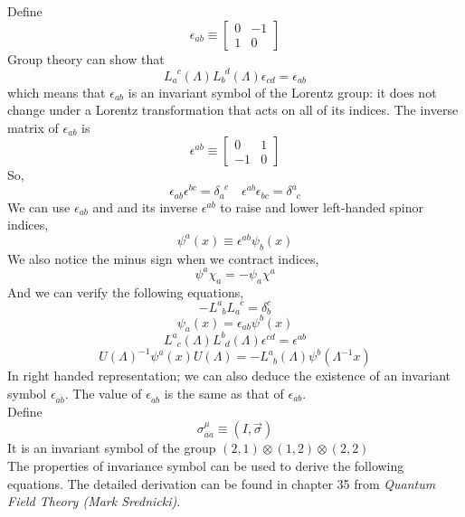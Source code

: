 \noindent
Define
\[\epsilon_{ab} \equiv \left[ \begin{matrix} 0& -1\\ 1& 0\end{matrix} \right] \]
Group theory can show that
\[L_a^{\phantom{a}c}(\Lambda) L_b^{\phantom{b}d}(\Lambda) \epsilon_{cd} = \epsilon
_{ab}\]
which means that $\epsilon_{ab}$ is an invariant symbol of the Lorentz group: it does not change under a Lorentz transformation that acts on all of its indices. The inverse matrix of $\epsilon_{ab}$ is
\[\epsilon^{ab} \equiv \left[ \begin{matrix} 0& 1\\ -1& 0\end{matrix} \right] \]
So,
\[\epsilon_{ab}\epsilon^{bc} = \delta_a^{\phantom{a}c} \quad \epsilon^{ab}\epsilon_{bc} = \delta^a_{\phantom{a}c}\]
We can use $\epsilon_{ab}$ and and its inverse $\epsilon^{ab}$ to raise and lower left-handed spinor indices, 
\[\psi^a(x) \equiv \epsilon^{ab} \psi_b(x)\]
We also notice the minus sign when we contract indices,
\[\psi^a \chi_a = -\psi_a \chi^a\]
And we can verify the following equations,
\[-L^a_{\phantom{a}b} L_a^{\phantom{a}c} = \delta^c_b \]
\[\psi_a(x) = \epsilon_{ab} \psi^b(x)\]
\[L^a_{\phantom{a}c}(\Lambda) L^b_{\phantom{b}d}(\Lambda) \epsilon^{cd} = \epsilon
^{ab}\]
\[U(\Lambda)^{-1} \psi^a(x) U(\Lambda) = -L^a_{\phantom{a}b}(\Lambda) \psi^b(\Lambda^{-1}x)\]
In right handed representation; we can also deduce the existence of an invariant symbol $\epsilon_{\dot{a}\dot{b}}$. The value of $\epsilon_{\dot{a}\dot{b}}$ is the same as that of $\epsilon_{ab}$.\\
Define
\[\sigma^{\mu}_{a\dot{a}} \equiv (I,\vec{\sigma})\]
It is an invariant symbol of the group $(2,1) \otimes (1,2) \otimes (2,2)$
\\
The properties of invariance symbol can be used to derive the following equations. The detailed derivation can be found in chapter 35 from \emph{Quantum Field Theory (Mark Srednicki)}.

